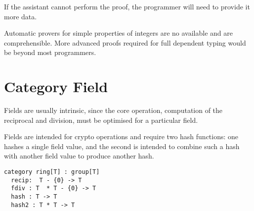\documentclass[oneside]{book}
\theoremstyle{plain}
\theoremstyle{definition}
\theoremstyle{plain}
\begin{document}
If the assistant cannot perform the proof, the programmer will
need to provide it more data.

Automatic provers for simple properties of integers are no available
and are comprehensible. More advanced proofs required for full
dependent typing would be beyond most programmers.


\section{Category Field}
Fields are usually intrinsic, since the core operation, computation
of the reciprocal and division, must be optimised for a particular
field.

Fields are intended for crypto operations and require two hash functions:
one hashes a single field value, and the second is intended to combine 
such a hash with another field value to produce another hash.

\begin{verbatim}
category ring[T] : group[T]
  recip:  T - {0} -> T
  fdiv : T  * T - {0} -> T
  hash : T -> T
  hash2 : T * T -> T
\end{verbatim}

\cleardoublepage
{}
\printbibliography
\end{document}
